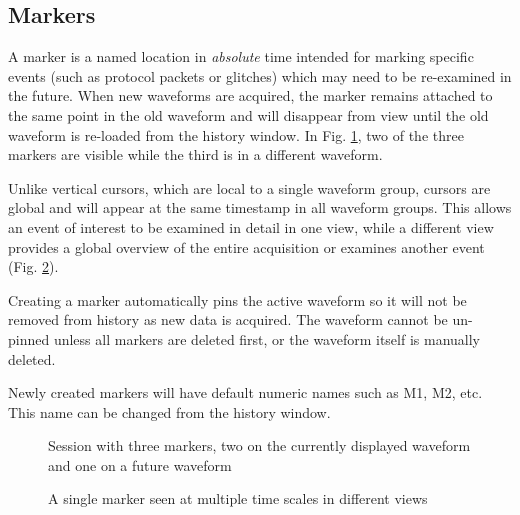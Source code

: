 \subsection{Markers}
\label{sec:markers}

A marker is a named location in \emph{absolute} time intended for marking specific events (such as protocol packets or
glitches) which may need to be re-examined in the future. When new waveforms are acquired, the marker remains attached
to the same point in the old waveform and will disappear from view until the old waveform is re-loaded from the history
window. In Fig. \ref{markers}, two of the three markers are visible while the third is in a different waveform.

Unlike vertical cursors, which are local to a single waveform group, cursors are global and will appear at the same
timestamp in all waveform groups. This allows an event of interest to be examined in detail in one view, while a
different view provides a global overview of the entire acquisition or examines another event (Fig.
\ref{marker-multiview}).

Creating a marker automatically pins the active waveform so it will not be removed from history as new data is
acquired. The waveform cannot be un-pinned unless all markers are deleted first, or the waveform itself is manually
deleted.

Newly created markers will have default numeric names such as M1, M2, etc. This name can be changed from the history
window.

\begin{figure}[H]
\centering
{}
\caption{Session with three markers, two on the currently displayed waveform and one on a future waveform}
\label{markers}
\end{figure}

\begin{figure}[H]
\centering
{}
\caption{A single marker seen at multiple time scales in different views}
\label{marker-multiview}
\end{figure}


